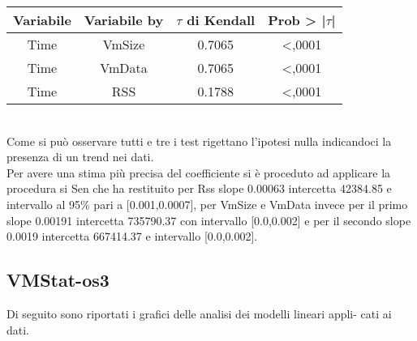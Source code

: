 \begin{table}[htbp]
    \centering
    \label{tab:esempio}
    \begin{tabular}{|c|c|c|c|} %
        \hline
        Variabile & Variabile by & $\tau$ di Kendall &Prob > |$\tau$| \\ %
        \hline
        Time & VmSize & 0.7065 & <,0001\\
        Time & VmData & 0.7065 & <,0001\\
        Time & RSS & 0.1788 & <,0001\\
        \hline
    \end{tabular}
\end{table} \\
Come si può osservare tutti e tre i test rigettano l'ipotesi nulla indicandoci la presenza di un trend nei dati.\\
Per avere una stima più precisa del coefficiente si è proceduto ad applicare la procedura si Sen che ha restituito per Rss slope 0.00063 intercetta 42384.85 e intervallo al 95\% pari a [0.001,0.0007], per VmSize e VmData invece per il primo slope 0.00191 intercetta 735790.37 con intervallo [0.0,0.002] e per il secondo slope 0.0019 intercetta 667414.37 e intervallo [0.0,0.002].
\newpage
\subsection{VMStat-os3}
Di seguito sono riportati i grafici delle analisi dei modelli lineari appli-
cati ai dati.

